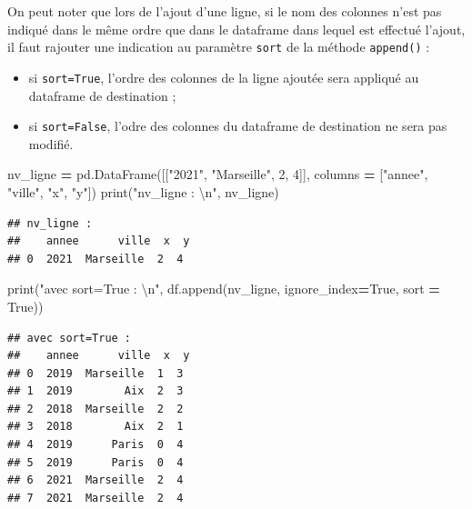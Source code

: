 \documentclass[12pt,]{book}
\newenvironment{Shaded}{\begin{snugshade}}{\end{snugshade}}
\newcommand{\DecValTok}[1]{\textcolor[rgb]{0.00,0.00,0.81}{#1}}
\newcommand{\CharTok}[1]{\textcolor[rgb]{0.31,0.60,0.02}{#1}}
\newcommand{\StringTok}[1]{\textcolor[rgb]{0.31,0.60,0.02}{#1}}
\newcommand{\VariableTok}[1]{\textcolor[rgb]{0.00,0.00,0.00}{#1}}
\newcommand{\OperatorTok}[1]{\textcolor[rgb]{0.81,0.36,0.00}{\textbf{#1}}}
\newcommand{\BuiltInTok}[1]{#1}
\newcommand{\NormalTok}[1]{#1}
\providecommand{\tightlist}{%
  \setlength{\itemsep}{0pt}\setlength{\parskip}{0pt}}
\numberwithin{equation}{section}
\numberwithin{countremarque}{section}
\begin{document}
On peut noter que lors de l'ajout d'une ligne, si le nom des colonnes
n'est pas indiqué dans le même ordre que dans le dataframe dans lequel
est effectué l'ajout, il faut rajouter une indication au paramètre
\texttt{sort} de la méthode \texttt{append()} :

\begin{itemize}
\tightlist
\item
  si \texttt{sort=True}, l'ordre des colonnes de la ligne ajoutée sera
  appliqué au dataframe de destination ;
\item
  si \texttt{sort=False}, l'odre des colonnes du dataframe de
  destination ne sera pas modifié.
\end{itemize}

\begin{Shaded}
\begin{Highlighting}[]
\NormalTok{nv_ligne }\OperatorTok{=}\NormalTok{ pd.DataFrame([[}\StringTok{"2021"}\NormalTok{, }\StringTok{"Marseille"}\NormalTok{, }\DecValTok{2}\NormalTok{, }\DecValTok{4}\NormalTok{]],}
\NormalTok{                       columns }\OperatorTok{=}\NormalTok{ [}\StringTok{"annee"}\NormalTok{, }\StringTok{"ville"}\NormalTok{, }\StringTok{"x"}\NormalTok{, }\StringTok{"y"}\NormalTok{])}
\BuiltInTok{print}\NormalTok{(}\StringTok{"nv_ligne : }\CharTok{\textbackslash{}n}\StringTok{"}\NormalTok{, nv_ligne)}
\end{Highlighting}
\end{Shaded}

\begin{lstlisting}
## nv_ligne : 
##    annee      ville  x  y
## 0  2021  Marseille  2  4
\end{lstlisting}

\begin{Shaded}
\begin{Highlighting}[]
\BuiltInTok{print}\NormalTok{(}\StringTok{"avec sort=True : }\CharTok{\textbackslash{}n}\StringTok{"}\NormalTok{, }
\NormalTok{  df.append(nv_ligne, ignore_index}\OperatorTok{=}\VariableTok{True}\NormalTok{, sort }\OperatorTok{=} \VariableTok{True}\NormalTok{))}
\end{Highlighting}
\end{Shaded}

\begin{lstlisting}
## avec sort=True : 
##    annee      ville  x  y
## 0  2019  Marseille  1  3
## 1  2019        Aix  2  3
## 2  2018  Marseille  2  2
## 3  2018        Aix  2  1
## 4  2019      Paris  0  4
## 5  2019      Paris  0  4
## 6  2021  Marseille  2  4
## 7  2021  Marseille  2  4
\end{lstlisting}
\end{document}
